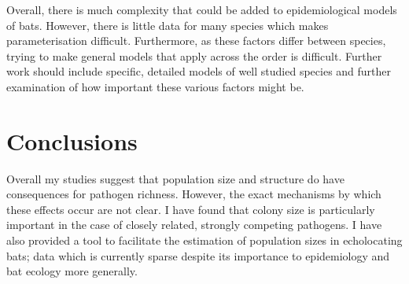 Overall, there is much complexity that could be added to epidemiological models of bats.
However, there is little data for many species which makes parameterisation difficult.
Furthermore, as these factors differ between species, trying to make general models that apply across the order is difficult.
Further work should include specific, detailed models of well studied species and further examination of how important these various factors might be.




\section{Conclusions}


Overall my studies suggest that population size and structure do have consequences for pathogen richness. 
However, the exact mechanisms by which these effects occur are not clear.
I have found that colony size is particularly important in the case of closely related, strongly competing pathogens.
I have also provided a tool to facilitate the estimation of population sizes in echolocating bats; data which is currently sparse despite its importance to epidemiology and bat ecology more generally.



